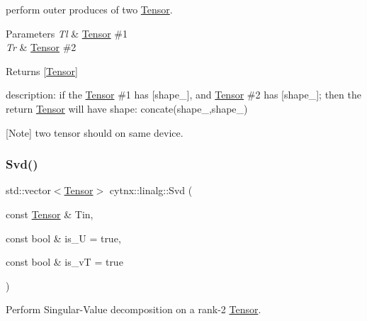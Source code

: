 perform outer produces of two \hyperlink{classcytnx_1_1Tensor}{Tensor}. 


\begin{DoxyParams}{Parameters}
{\em Tl} & \hyperlink{classcytnx_1_1Tensor}{Tensor} \#1 \\
\hline
{\em Tr} & \hyperlink{classcytnx_1_1Tensor}{Tensor} \#2 \\
\hline
\end{DoxyParams}
\begin{DoxyReturn}{Returns}
\mbox{[}\hyperlink{classcytnx_1_1Tensor}{Tensor}\mbox{]}
\end{DoxyReturn}
description\+: if the \hyperlink{classcytnx_1_1Tensor}{Tensor} \#1 has \mbox{[}shape\+\_\mbox{]}, and \hyperlink{classcytnx_1_1Tensor}{Tensor} \#2 has \mbox{[}shape\+\_\mbox{]}; then the return \hyperlink{classcytnx_1_1Tensor}{Tensor} will have shape\+: concate(shape\+\_,shape\+\_)

\mbox{[}Note\mbox{]} two tensor should on same device. \mbox{\label{namespacecytnx_1_1linalg_ac17f16959a4849ea91bce712d24d4e4e}} 
\subsubsection{\texorpdfstring{Svd()}{Svd()}}
{\footnotesize\ttfamily std\+::vector$<$\hyperlink{classcytnx_1_1Tensor}{Tensor}$>$ cytnx\+::linalg\+::\+Svd (\begin{DoxyParamCaption}\item[{const \hyperlink{classcytnx_1_1Tensor}{Tensor} \&}]{Tin,  }\item[{const bool \&}]{is\+\_\+U = {\ttfamily true},  }\item[{const bool \&}]{is\+\_\+vT = {\ttfamily true} }\end{DoxyParamCaption})}



Perform Singular-\/\+Value decomposition on a rank-\/2 \hyperlink{classcytnx_1_1Tensor}{Tensor}. 


